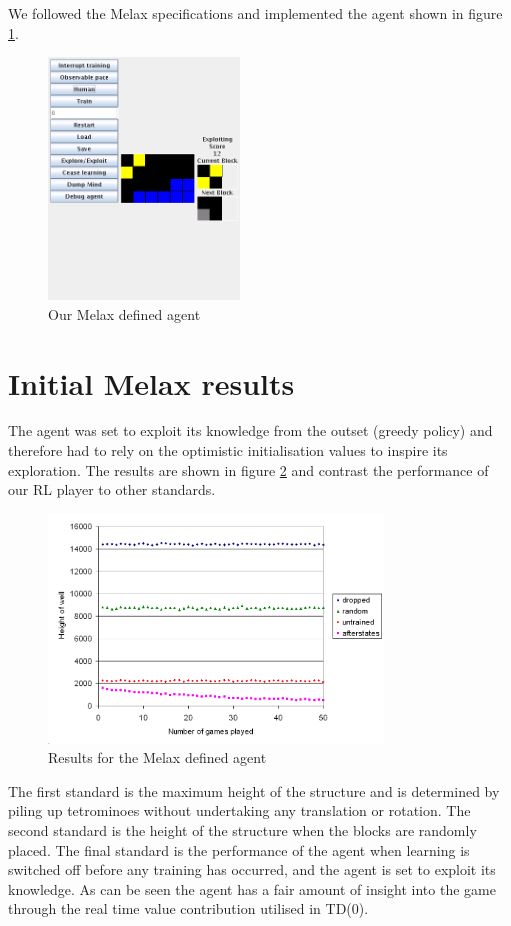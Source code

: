 \documentclass{rucsthesis}
\begin{document}
We followed the Melax specifications and implemented the agent shown in figure \ref{fig:mymelax}.

\begin{figure}[h]
\centering
\includegraphics[width=2in]{mymelax.png}
\caption{Our Melax defined agent}
\label{fig:mymelax}
\end{figure}

\section{Initial Melax results}

The agent was set to exploit its knowledge from the outset (greedy policy) and therefore had to rely on the optimistic initialisation values to inspire its exploration. The results are shown in figure \ref{fig:mymelaxresults} and contrast the performance of our RL player to other standards. 

\begin{figure}[h]
\centering
\includegraphics[width=3.5in]{mymelaxresults.png}
\caption{Results for the Melax defined agent}
\label{fig:mymelaxresults}
\end{figure}

The first standard is the maximum height of the structure and is determined by piling up tetrominoes without undertaking any translation or rotation. The second standard is the height of the structure when the blocks are randomly placed. The final standard is the performance of the agent when learning is switched off before any training has occurred, and the agent is set to exploit its knowledge. As can be seen the agent has a fair amount of insight into the game through the real time value contribution utilised in TD(0).
\end{document}
